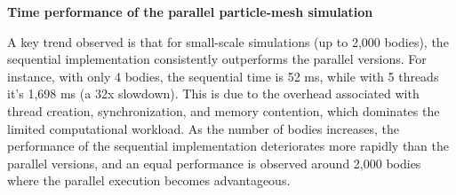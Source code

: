 \documentclass{article}
\begin{document}
\textbf{Time performance of the parallel particle-mesh simulation}
\begin{table}[h!]
\centering
{}
\caption{Execution time and best speedup for varying numbers of bodies and thread counts ($\text{grid size} = 10$). Tested on MacBook Air M2 – 8-core CPU.}
\label{tab:best_speedup}
\end{table}

A key trend observed is that for small-scale simulations (up to 2,000 bodies), the sequential implementation consistently outperforms the parallel versions. For instance, with only 4 bodies, the sequential time is 52 ms, while with 5 threads it's 1,698 ms (a 32x slowdown). This is due to the overhead associated with thread creation, synchronization, and memory contention, which dominates the limited computational workload. As the number of bodies increases, the performance of the sequential implementation deteriorates more rapidly than the parallel versions, and an equal performance is observed around 2,000 bodies where the parallel execution becomes advantageous.
\end{document}

